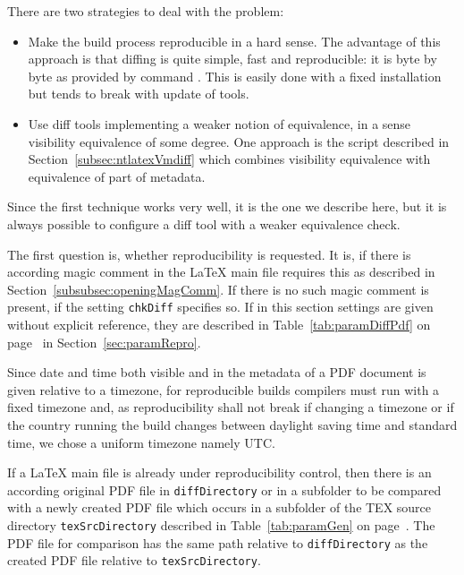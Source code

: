 There are two strategies to deal with the problem: 
%
\begin{itemize}
  \item
  Make the build process reproducible in a hard sense. 
  The advantage of this approach is that diffing is quite simple, 
  fast and reproducible: 
  it is byte by byte as provided by command . 
  This is easily done with a fixed installation 
  but tends to break with update of tools. 
  \item
  Use diff tools implementing a weaker notion of equivalence, 
  in a sense visibility equivalence of some degree. 
  One approach is the script  
  described in Section~\ref{subsec:ntlatexVmdiff}
  which combines visibility equivalence 
  with equivalence of part of metadata. 
\end{itemize}%

Since the first technique works very well, it is the one we describe here, 
but it is always possible to configure a diff tool with a weaker equivalence check. 

The first question is, whether reproducibility is requested. 
It is, if there is according magic comment in the \LaTeX{} main file requires this 
as described in Section~\ref{subsubsec:openingMagComm}. 
If there is no such magic comment is present, if the setting \texttt{chkDiff} specifies so. 
If in this section settings are given without explicit reference, 
they are described in Table~\ref{tab:paramDiffPdf} on page~\pageref{tab:paramDiffPdf} 
in Section~\ref{sec:paramRepro}. 

Since date and time both visible and in the metadata of a PDF document 
is given relative to a timezone, 
for reproducible builds compilers must run with a fixed timezone 
and, as reproducibility shall not break if changing a timezone 
or if the country running the build changes between daylight saving time and standard time, 
we chose a uniform timezone namely UTC\@. 

If a \LaTeX{} main file is already under reproducibility control, 
then there is an according original PDF file in \texttt{diffDirectory} or in a subfolder 
to be compared with a newly created PDF file 
which occurs in a subfolder of the TEX source directory \texttt{texSrcDirectory} 
described in Table~\ref{tab:paramGen} on page~\pageref{tab:paramGen}. 
The PDF file for comparison has the same path relative to \texttt{diffDirectory} 
as the created PDF file relative to \texttt{texSrcDirectory}. 

